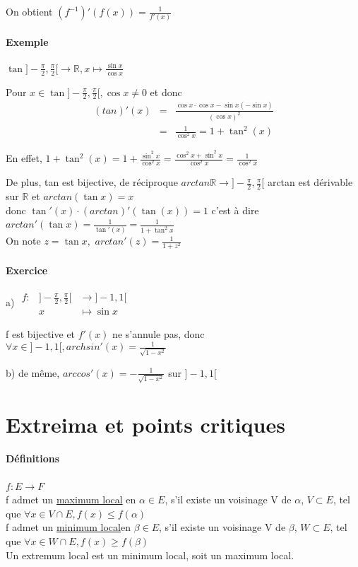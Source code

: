 On obtient $(f^{-1})'(f(x))=\frac{1}{f'(x)}$

\paragraph{Exemple} $\tan]-\frac{\pi}{2}, \frac{\pi}{2}[ \rightarrow \mathbb{R}, x\mapsto \frac{\sin x}{\cos x}$

Pour $x\in \tan]-\frac{\pi}{2},\frac{\pi}{2}[, \cos x \neq 0$ et donc \[
		\begin{array}{rcl}
			(tan)'(x) &=& \frac{\cos x \cdot \cos x - \sin x(-\sin x)}{(\cos x)^2} \\
										   &=& \frac{1}{\cos^2 x} = 1+\tan^2(x)
	\end{array}\]

	En effet, $1+\tan^2(x) = 1+\frac{\sin^2x}{\cos^2x} = \frac{\cos^2x+\sin^2x}{\cos^2x} = \frac{1}{\cos^2x}$

De plus, tan est bijective, de réciproque $arctan \mathbb{R} \rightarrow ]-\frac{\pi}{2}, \frac{\pi}{2}[$ arctan est dérivable sur $\mathbb{R}$ et $arctan(\tan x)=x$ ~\\
	donc $\tan'(x) \cdot (arctan)'(\tan(x)) = 1$ c'est à dire ~\\
	$arctan'(\tan x) = \frac{1}{\tan'(x)} = \frac{1}{1+\tan^2x}$ ~\\
	On note $z=\tan x, $ $arctan'(z) = \frac{1}{1+z^2}$

	\paragraph{Exercice} a)
$\begin{array}{rcl}
f:&]-\frac{\pi}{2}, \frac{\pi}{2}[&\rightarrow ]-1, 1[ \\
							 &x&\mapsto \sin x
\end{array}$

f est bijective et $f'(x)$ ne s'annule pas, donc $\forall x \in ]-1, 1[, archsin'(x) = \frac{1}{\sqrt{1-x^2}}$

b) de même, $arccos'(x) = -\frac{1}{\sqrt{1-x^2}}$ sur $]-1, 1[$

	\section{Extreima et points critiques}

	\paragraph{Définitions} $f:E \rightarrow F$ ~\\
	f admet un \ul{maximum local} en $\alpha \in E$, s'il existe un voisinage V de $\alpha$, $V\subset E$, tel que $\forall x \in V\cap E,f(x) \leq f(\alpha)$ ~\\
	f admet un \ul{minimum local}en $\beta \in E$, s'il existe un voisinage V de $\beta$, $W\subset E$, tel que $\forall x \in W\cap E,f(x) \geq f(\beta)$ ~\\
	Un extremum local est un minimum local, soit un maximum local.


